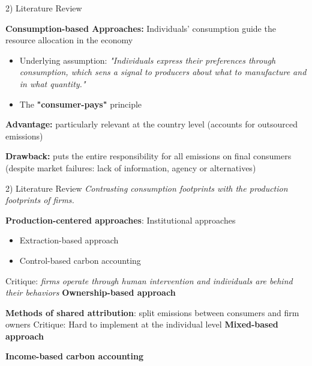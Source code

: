 \documentclass[10pt]{beamer}
\begin{document}
\begin{frame}{2) Literature Review}

\textbf{Consumption-based Approaches:} Individuals' consumption guide the resource allocation in the economy
    \begin{itemize}
        \item Underlying assumption: \textit{"Individuals express their preferences through consumption, which sens a signal to producers about what to manufacture and in what quantity."}
        \item The \textbf{"consumer-pays"} principle
    \end{itemize}

    {\small
    \textbf{Advantage:} particularly relevant at the country level (accounts for outsourced emissions)

    \textbf{Drawback:} puts the entire responsibility for all emissions on final consumers (despite market failures: lack of information, agency or alternatives)
    }
    
\end{frame}



\begin{frame}{2) Literature Review}
\textit{Contrasting consumption footprints with the production footprints of firms.}
\vspace{7pt}

\textbf{Production-centered approaches}: Institutional approaches
    \begin{itemize}
        \item Extraction-based approach
        \item Control-based carbon accounting
    \end{itemize}
{\small Critique: \textit{firms operate through human intervention and individuals are behind their behaviors}
} \rightarrow \textbf{Ownership-based approach}
\vspace{10pt}

\textbf{Methods of shared attribution}: split emissions between consumers and firm owners 
{\small Critique: Hard to implement at the individual level} \rightarrow \textbf{Mixed-based approach}
\vspace{10pt}

\textbf{Income-based carbon accounting}

\end{frame}
\end{document}
